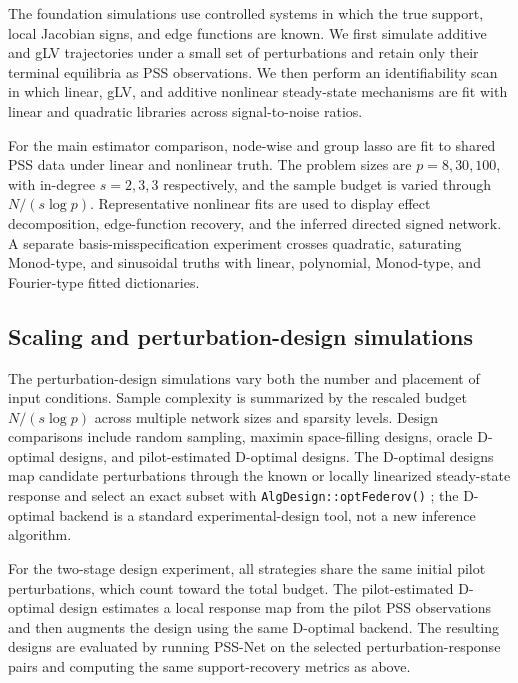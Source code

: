 The foundation simulations use controlled systems in which the true support,
local Jacobian signs, and edge functions are known.  We first simulate additive
and gLV trajectories under a small set of perturbations and retain only their
terminal equilibria as PSS observations.  We then perform an identifiability
scan in which linear, gLV, and additive nonlinear steady-state mechanisms are
fit with linear and quadratic libraries across signal-to-noise ratios.

For the main estimator comparison, node-wise \adsiht{} and group lasso are fit
to shared PSS data under linear and nonlinear truth.  The problem sizes are
$p=8,30,100$, with in-degree $s=2,3,3$ respectively, and the sample budget is
varied through $N/(s\log p)$.  Representative nonlinear fits are used to display
effect decomposition, edge-function recovery, and the inferred directed signed
network.  A separate basis-misspecification experiment crosses quadratic,
saturating Monod-type, and sinusoidal truths with linear, polynomial,
Monod-type, and Fourier-type fitted dictionaries.

\subsection{Scaling and perturbation-design simulations}
\label{sec:sim:design}

The perturbation-design simulations vary both the number and placement of input
conditions.  Sample complexity is summarized by the rescaled budget
$N/(s\log p)$ across multiple network sizes and sparsity levels.  Design
comparisons include random sampling, maximin space-filling designs, oracle
D-optimal designs, and pilot-estimated D-optimal designs.  The D-optimal designs
map candidate perturbations through the known or locally linearized
steady-state response and select an exact subset with
\texttt{AlgDesign::optFederov()}
\citep{wheeler2025algdesign,fedorov1972theory}; the D-optimal backend is a
standard experimental-design tool, not a new inference algorithm.

For the two-stage design experiment, all strategies share the same initial
pilot perturbations, which count toward the total budget.  The pilot-estimated
D-optimal design estimates a local response map from the pilot PSS observations
and then augments the design using the same D-optimal backend.  The resulting
designs are evaluated by running PSS-Net on the selected perturbation-response
pairs and computing the same support-recovery metrics as above.

